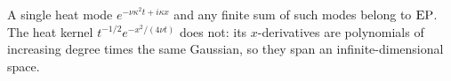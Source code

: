 \begin{example}\label{ex:heat-rich-poor}
A single heat mode $e^{-\nu\kappa^2t+i\kappa x}$ and any finite sum of such modes belong to $\mathrm{EP}$.
The heat kernel $t^{-1/2}e^{-x^2/(4\nu t)}$ does not: its $x$-derivatives are polynomials of
increasing degree times the same Gaussian, so they span an infinite-dimensional space.
\end{example}
